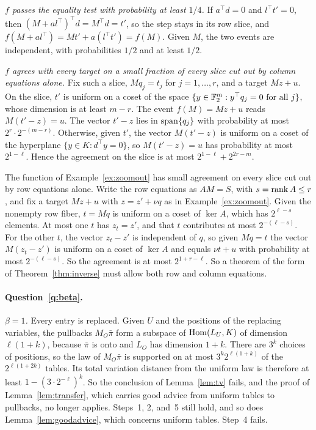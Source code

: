 \emph{$f$ passes the equality test with probability at least $1/4$.} If $a^\top d=0$ and $l^\top t'=0$, then $(M+al^\top)^\top d=M^\top d=t'$, so the step stays in its row slice, and $f(M+al^\top)=Mt'+a(l^\top t')=f(M)$. Given $M$, the two events are independent, with probabilities $1/2$ and at least $1/2$.

\emph{$f$ agrees with every target on a small fraction of every slice cut out by column equations alone.} Fix such a slice, $Mq_j=t_j$ for $j=1,\dots,r$, and a target $Mz+u$. On the slice, $t'$ is uniform on a coset of the space $\{y\in\mathbb{F}_2^m:y^\top q_j=0\text{ for all }j\}$, whose dimension is at least $m-r$. The event $f(M)=Mz+u$ reads $M(t'-z)=u$. The vector $t'-z$ lies in $\operatorname{span}\{q_j\}$ with probability at most $2^r\cdot2^{-(m-r)}$. Otherwise, given $t'$, the vector $M(t'-z)$ is uniform on a coset of the hyperplane $\{y\in K:d^\top y=0\}$, so $M(t'-z)=u$ has probability at most $2^{1-\ell}$. Hence the agreement on the slice is at most $2^{1-\ell}+2^{2r-m}$.

The function of Example~\ref{ex:zoomout} has small agreement on every slice cut out by row equations alone. Write the row equations as $AM=S$, with $s=\operatorname{rank} A\le r$, and fix a target $Mz+u$ with $z=z'+\nu q$ as in Example~\ref{ex:zoomout}. Given the nonempty row fiber, $t=Mq$ is uniform on a coset of $\ker A$, which has $2^{\ell-s}$ elements. At most one $t$ has $z_t=z'$, and that $t$ contributes at most $2^{-(\ell-s)}$. For the other $t$, the vector $z_t-z'$ is independent of $q$, so given $Mq=t$ the vector $M(z_t-z')$ is uniform on a coset of $\ker A$ and equals $\nu t+u$ with probability at most $2^{-(\ell-s)}$. So the agreement is at most $2^{1+r-\ell}$. So a theorem of the form of Theorem~\ref{thm:inverse} must allow both row and column equations.

\paragraph{Question~\ref{q:beta}.} \emph{$\beta=1$.} Every entry is replaced. Given $U$ and the positions of the replacing variables, the pullbacks $M_O\bar\pi$ form a subspace of $\operatorname{Hom}(L_U,K)$ of dimension $\ell(1+k)$, because $\bar\pi$ is onto and $L_O$ has dimension $1+k$. There are $3^k$ choices of positions, so the law of $M_O\bar\pi$ is supported on at most $3^k2^{\ell(1+k)}$ of the $2^{\ell(1+2k)}$ tables. Its total variation distance from the uniform law is therefore at least $1-(3\cdot2^{-\ell})^k$. So the conclusion of Lemma~\ref{lem:tv} fails, and the proof of Lemma~\ref{lem:transfer}, which carries good advice from uniform tables to pullbacks, no longer applies. Steps~1, 2, and~5 still hold, and so does Lemma~\ref{lem:goodadvice}, which concerns uniform tables. Step~4 fails.


